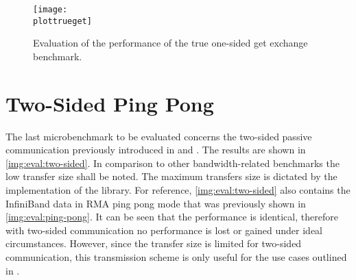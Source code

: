 \begin{figure}[htb]
\centering
\texttt{[image: \\plottrueget]}
\caption{Evaluation of the performance of the true one-sided get exchange benchmark.}
\label{img:eval:true-onesided:get}
\end{figure}

\section{Two-Sided Ping Pong}

The last microbenchmark to be evaluated concerns the two-sided passive communication previously introduced in  and . The results are shown in \autoref{img:eval:two-sided}. In comparison to other bandwidth-related benchmarks the low transfer size shall be noted. The maximum transfers size is dictated by the implementation of the library. For reference, \autoref{img:eval:two-sided} also contains the InfiniBand data in \ac{RMA} ping pong mode that was previously shown in \autoref{img:eval:ping-pong}. It can be seen that the performance is identical, therefore with two-sided communication no performance is lost or gained under ideal circumstances. However, since the transfer size is limited for two-sided communication, this transmission scheme is only useful for the use cases outlined in .

